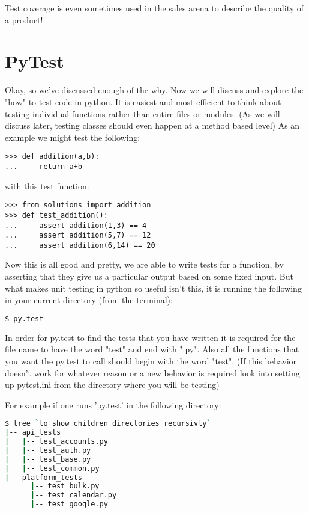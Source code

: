 \documentclass[nociteref]{../../SIAM-GH-book}
\begin{document}
Test coverage is even sometimes used in the sales arena to describe the quality of a product!

\section*{PyTest}

Okay, so we've discussed enough of the why. Now we will discuss and explore the "how" to test code in python.
It is easiest and most efficient to think about testing individual functions rather than entire files or modules.
(As we will discuss later, testing classes should even happen at a method based level)
As an example we might test the following:
\begin{lstlisting}
>>> def addition(a,b):
...     return a+b
\end{lstlisting}
with this test function:
\begin{lstlisting}
>>> from solutions import addition
>>> def test_addition():
...     assert addition(1,3) == 4
...     assert addition(5,7) == 12
...     assert addition(6,14) == 20
\end{lstlisting}

Now this is all good and pretty, we are able to write tests for a function, by asserting that they give us a particular output based on some fixed input.
But what makes unit testing in python so useful isn't this, it is running the following in your current directory (from the terminal):
\begin{lstlisting}[language=bash]
  $ py.test
\end{lstlisting}

\begin{info}
In order for py.test to find the tests that you have written it is required for the file name to have the word "test" and end with ".py".
Also all the functions that you want the py.test to call should begin with the word "test".
(If this behavior doesn't work for whatever reason or a new behavior is required look into setting up pytest.ini from the directory where you will be testing)\\
\end{info}

For example if one runs 'py.test' in the following directory:
\begin{lstlisting}[language=bash]
$ tree `to show children directories recursivly`
|-- api_tests
|   |-- test_accounts.py
|   |-- test_auth.py
|   |-- test_base.py
|   |-- test_common.py
|-- platform_tests
      |-- test_bulk.py
      |-- test_calendar.py
      |-- test_google.py
\end{lstlisting}
\end{document}
